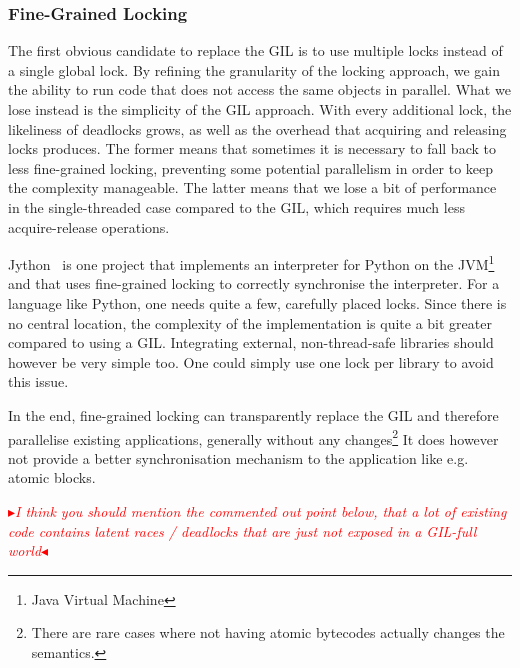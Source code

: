\documentclass{sigplanconf}
\newcommand{\mynote}[2]{%
  \textcolor{red}{%
    \fbox{\bfseries\sffamily\scriptsize#1}%
    {\small$\blacktriangleright$\textsf{\emph{#2}}$\blacktriangleleft$}%
  }%
}
\newcommand\cfbolz[1]{\mynote{Carl Friedrich}{#1}}
\begin{document}
\subsubsection{Fine-Grained Locking}

The first obvious candidate to replace the GIL is to use multiple
locks instead of a single global lock. By refining the granularity of
the locking approach, we gain the ability to run code that does not
access the same objects in parallel. What we lose instead is the
simplicity of the GIL approach. With every additional lock, the
likeliness of deadlocks grows, as well as the overhead that acquiring
and releasing locks produces. The former means that sometimes it is
necessary to fall back to less fine-grained locking, preventing some
potential parallelism in order to keep the complexity manageable.
The latter means that we lose a bit of performance in the
single-threaded case compared to the GIL, which requires much less
acquire-release operations.

Jython~\cite{webjython} is one project that implements an
interpreter for Python on the JVM\footnote{Java Virtual Machine} and
that uses fine-grained locking to correctly synchronise the
interpreter. For a language like Python, one needs quite a few,
carefully placed locks. Since there is no central location, the
complexity of the implementation is quite a bit greater compared to
using a GIL. Integrating external, non-thread-safe libraries should
however be very simple too. One could simply use one lock per library
to avoid this issue.

In the end, fine-grained locking can transparently replace the GIL
and therefore parallelise existing applications, generally without any
changes\footnote{There are rare cases where not having atomic
bytecodes actually changes the semantics.}
It does however not provide a better synchronisation
mechanism to the application like e.g. atomic blocks.

\cfbolz{I think you should mention the commented out point below, that a lot of existing code contains latent races / deadlocks that are just not exposed in a GIL-full world}
\end{document}
